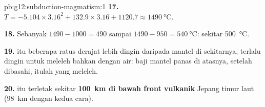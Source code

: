 \begin{solution}{pb:g12:subduction-magmatism:1}
\textbf{17.} $T = -5.104 \times 3.16^2 + 132.9 \times 3.16 + 1120.7 \approx
\qty{1490}{\celsius}$.

\textbf{18.} Sebanyak $1490 - 1000 = 490$ sampai $1490 - 950 = \qty{540}{\celsius}$:
sekitar \qty{500}{\celsius}.

\textbf{19.}  itu beberapa ratus derajat lebih dingin daripada mantel
di sekitarnya, terlalu dingin untuk meleleh bahkan dengan air: baji mantel
panas di atasnya, setelah dibasahi, itulah yang meleleh.

\textbf{20.}  itu terletak sekitar \textbf{\qty{100}{km} di bawah front
vulkanik} Jepang timur laut (\qty{98}{km} dengan kedua cara).
\end{solution}
